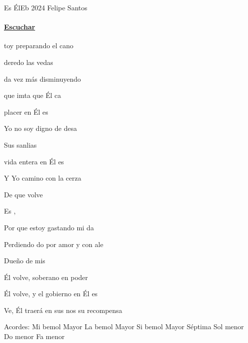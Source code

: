 \documentclass[12pt, spanish]{book}
\newcommand{\NotCCLIed}{\relax}
\begin{document}
    \begin{song}{Es Él}{Eb}
        {2024} %
        {Felipe Santos}
        {} %
        {} %
        \ifChordBk
            \paragraph{\mbox{}\hfill\protect\href{https://open.spotify.com/intl-es/track/7sqjdAq2iSmQeDqOPVDv9P}{Escuchar}\mbox{}\hfill}
        \fi


        \begin{SBOpGroup}
            toy preparando el cano

            deredo las vedas

            da vez más disminuyendo

            que imta que Él ca
        \end{SBOpGroup}
        \vskip 20pt
        \begin{SBOpGroup}
             placer en Él es

            Yo no soy digno de desa

            Sus sanlias

             vida entera en Él es

            Y Yo camino con la cerza

            De que volve
        \end{SBOpGroup}

        \begin{SBChorus}
            Es ,

            Por  que estoy gastando mi da

            Perdiendo do por amor y con ale

            Dueño de mis 
        \end{SBChorus}

        \begin{SBOpGroup}
            Él volve, soberano en poder

            Él volve, y el gobierno en Él es

            Ve, Él traerá en sus nos su recompensa
        \end{SBOpGroup}

        \ifChordBk
        \begin{SBOpGroup}
            Acordes:\break
            \upchord{\Eflat}\qquad Mi bemol Mayor \hfill
            \upchord{\Aflat}\qquad La bemol Mayor \hfill\null\break
            \upchord{\Bflatseven}\quad Si bemol Mayor S\'eptima \hfill
            \upchord{\Gm}Sol menor \hfill\null\break
            \upchord{\Cm}Do menor \hfill
            \upchord{\Fm}\quad Fa menor \hfill\null\break
        \end{SBOpGroup}
        \fi
    \end{song}
\end{document}
